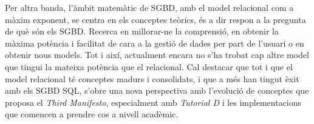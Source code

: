 Per altra banda, l'àmbit matemàtic de SGBD, amb el model relacional
com a màxim exponent, se centra en els conceptes teòrics, és a dir
respon a la pregunta de què són els SGBD. Recerca en millorar-ne la
comprensió, en obtenir la màxima potència i facilitat de cara a la
gestió de dades per part de l'usuari o en obtenir nous models. Tot i
així, actualment encara no s'ha trobat cap altre model que tingui la
mateixa potència que el relacional. Cal destacar que tot i que el
model relacional té conceptes madurs i consolidats, i que a més han
tingut èxit amb els SGBD SQL, s'obre una nova perspectiva amb
l'evolució de conceptes que proposa el \emph{Third Manifesto},
especialment amb \emph{Tutorial D} i les implementacions que comencen a prendre
cos a nivell acadèmic.




















